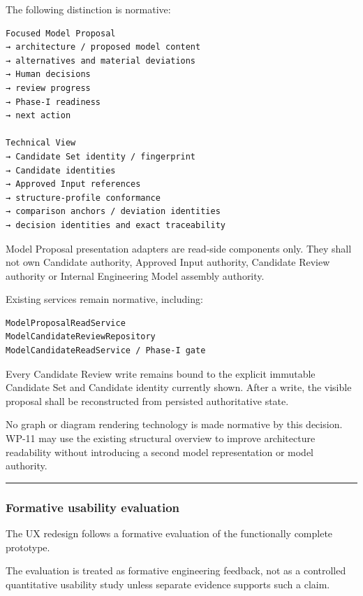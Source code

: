 The following distinction is normative:

\begin{verbatim}
Focused Model Proposal
→ architecture / proposed model content
→ alternatives and material deviations
→ Human decisions
→ review progress
→ Phase-I readiness
→ next action

Technical View
→ Candidate Set identity / fingerprint
→ Candidate identities
→ Approved Input references
→ structure-profile conformance
→ comparison anchors / deviation identities
→ decision identities and exact traceability
\end{verbatim}

Model Proposal presentation adapters are read-side components only. They shall not own Candidate authority, Approved Input authority, Candidate Review authority or Internal Engineering Model assembly authority.

Existing services remain normative, including:

\begin{verbatim}
ModelProposalReadService
ModelCandidateReviewRepository
ModelCandidateReadService / Phase-I gate
\end{verbatim}

Every Candidate Review write remains bound to the explicit immutable Candidate Set and Candidate identity currently shown. After a write, the visible proposal shall be reconstructed from persisted authoritative state.

No graph or diagram rendering technology is made normative by this decision. WP-11 may use the existing structural overview to improve architecture readability without introducing a second model representation or model authority.

\begin{center}\rule{0.5\linewidth}{0.5pt}\end{center}

\hypertarget{formative-usability-evaluation}{%
\subsubsection{Formative usability evaluation}\label{formative-usability-evaluation}}

The UX redesign follows a formative evaluation of the functionally complete prototype.

The evaluation is treated as formative engineering feedback, not as a controlled quantitative usability study unless separate evidence supports such a claim.

